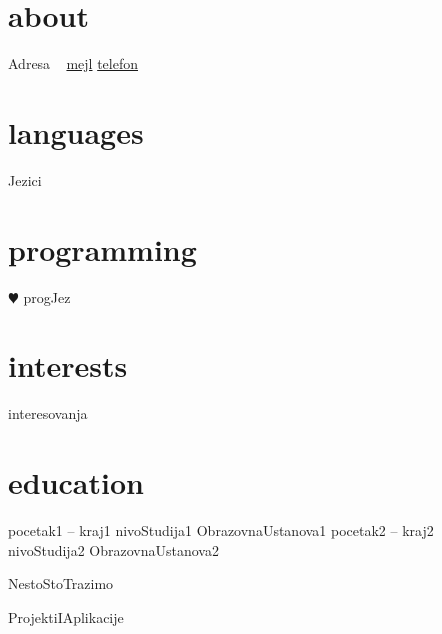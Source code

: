 \documentclass[]{friggeri-cv}
\begin{document}


\begin{aside}
  \section{about}
    Adresa
    ~
    \href{mailto:mejl}{mejl}
    \href{telefon}{telefon}
  \section{languages}
    Jezici
  \section{programming}
    {\color{red} $\varheartsuit$} progJez
\end{aside}

\section{interests}

interesovanja

\section{education}

\begin{entrylist}
  \entry
    {pocetak1 – kraj1}
    {nivoStudija1}
    {}
    {ObrazovnaUstanova1}
  \entry
    {pocetak2 – kraj2}
    {nivoStudija2}
    {}
    {ObrazovnaUstanova2}
  \end{entrylist}


NestoStoTrazimo


ProjektiIAplikacije
\end{document}
